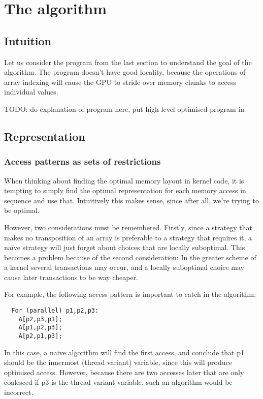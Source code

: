 \documentclass{article}
\begin{document}
\section{The algorithm}

\subsection{Intuition}

Let us consider the program from the last section to understand the goal of the algorithm. The program doesn't have good locality, because the operations of
array indexing will cause the GPU to stride over memory chunks to access individual values.

TODO: do explanation of program here, put high level optimised program in

\subsection{Representation}
\subsubsection{Access patterns as sets of restrictions}

When thinking about finding the optimal memory layout in kernel code, it is tempting to simply find the optimal representation for each memory access in
sequence and use that. Intuitively this makes sense, since after all, we’re trying to be optimal. 

However, two considerations must be remembered. Firstly, since a strategy that makes no transposition of an array is preferable to a strategy that requires it,
a naïve strategy will just forget about choices that are locally suboptimal. This becomes a problem because of the second consideration: In the greater scheme
of a kernel several transactions may occur, and a locally suboptimal choice may cause later transactions to be way cheaper.

For example, the following access pattern is important to catch in the algorithm:
\begin{verbatim}
  For (parallel) p1,p2,p3:
    A[p2,p3,p1];
    A[p1,p2,p3];
    A[p2,p1,p3];
\end{verbatim}

In this case, a naive algorithm will find the first access, and conclude that p1 should be the innermost (thread variant) variable, since this will produce
optimised access. However, because there are two accesses later that are only coalesced if p3 is the thread variant variable, such an algorithm would be
incorrect.
\end{document}
